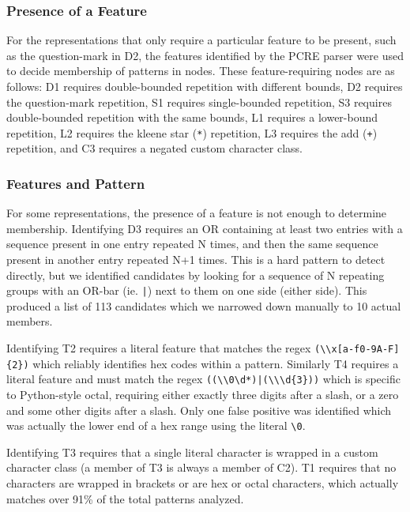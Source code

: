 \subsubsection{Presence of a Feature}
For the representations that only require a particular feature to be present, such as the question-mark in D2, the features identified by the PCRE parser were used to decide membership of patterns in nodes.
These feature-requiring nodes are as follows: D1 requires double-bounded repetition with different bounds, D2 requires the question-mark repetition, S1 requires single-bounded repetition, S3 requires double-bounded repetition with the same bounds,  L1 requires a lower-bound repetition, L2 requires the kleene star (\verb!*!) repetition, L3 requires the add (\verb!+!) repetition, and C3 requires a negated custom character class.

\subsubsection{Features  and Pattern}
For some representations, the presence of a feature is not enough to determine membership.
Identifying D3 requires an OR containing at least two entries with a sequence present in one entry repeated N times, and then the same sequence present in another entry repeated N+1 times.  This is a hard pattern to detect directly, but we identified candidates by looking for a sequence of N repeating groups with an OR-bar (ie. \verb!|!) next to them on one side (either side).  This produced a list of 113 candidates which we narrowed down manually to 10 actual members.


Identifying T2 requires a literal feature that matches the regex \verb!(\\x[a-f0-9A-F]{2})! which reliably identifies hex codes within a pattern.
Similarly T4 requires a literal feature and must match the regex \verb!((\\0\d*)|(\\\d{3}))! which is specific to Python-style octal, requiring either exactly three digits after a slash, or a zero and some other digits after a slash.  Only one false positive was identified which was actually the lower end of a hex range using the literal \verb!\0!.

Identifying T3 requires that a single literal character is wrapped in a custom character class (a member of T3 is always a member of C2).
 T1 requires that no characters are wrapped in brackets or are hex or octal characters, which actually matches over 91\% of the total patterns analyzed.

